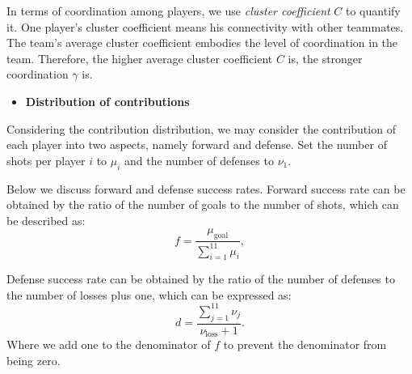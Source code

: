 \documentclass[12pt]{article}  %
\begin{document}
In terms of coordination among players, we use \textit{cluster coefficient} $C$ to quantify it. One player's cluster coefficient means his connectivity with other teammates. The team's average cluster coefficient embodies the level of coordination in the team. Therefore, the higher average cluster coefficient $C$ is, the stronger coordination $\gamma$ is. 

\vspace{4pt}
\begin{itemize}
    \item \textbf{Distribution of contributions}
\end{itemize}

Considering the contribution distribution, we may consider the contribution of each player into two aspects, namely forward and defense. Set the number of shots per player $i$ to $\mu_i$ and the number of defenses to $\nu_1$.

Below we discuss forward and defense success rates. Forward success rate can be obtained by the ratio of the number of goals to the number of shots, which can be described as:
\begin{equation}
    f=\frac{\mu_{\mathrm{goal}}}{\sum_{i=1}^{11}\mu_i},
\end{equation}

Defense success rate can be obtained by the ratio of the number of defenses to the number of losses plus one, which can be expressed as:
\begin{equation}
    d=\frac{\sum_{j=1}^{11}\nu_j}{\nu_{\mathrm{loss}}+1}.
\end{equation}
Where we add one to the denominator of $f$ to prevent the denominator from being zero.
\end{document}
